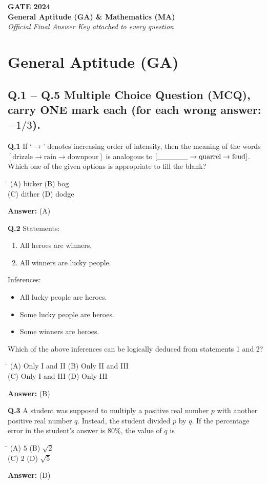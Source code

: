 \documentclass[11pt,a4paper]{article}
\newcommand{\optsfourA}[4]{%
  \begin{tabbing}
    \hspace{0.48\linewidth}\=\kill
    (A) #1 \> (B) #2 \\[2pt]
    (C) #3 \> (D) #4
  \end{tabbing}%
}
\newcommand{\ans}[1]{\textbf{Answer:} #1\par\medskip}
\begin{document}
\newpage
\begin{center}
  {\LARGE\bfseries GATE 2024}\\[4pt]
  {\large\bfseries General Aptitude (GA) \& Mathematics (MA)}\\[2pt]
  {\small\itshape Official Final Answer Key attached to every question}
\end{center}
\medskip

\section*{General Aptitude (GA)}

\subsection*{Q.1 -- Q.5 Multiple Choice Question (MCQ), carry ONE mark each (for each wrong answer: $-1/3$).}

\textbf{Q.1} If `$\to$' denotes increasing order of intensity, then the meaning of the words $[\text{drizzle} \to \text{rain} \to \text{downpour}]$ is analogous to $[\underline{\hspace{1.5cm}} \to \text{quarrel} \to \text{feud}]$. Which one of the given options is appropriate to fill the blank?
\optsfourA{bicker}{bog}{dither}{dodge}
\ans{(A)}

\textbf{Q.2} Statements:
\begin{enumerate}
  \setlength{\itemsep}{1pt}\setlength{\parskip}{0pt}
  \item All heroes are winners.
  \item All winners are lucky people.
\end{enumerate}
Inferences:
\begin{itemize}
  \setlength{\itemsep}{1pt}\setlength{\parskip}{0pt}
  \item[I.] All lucky people are heroes.
  \item[II.] Some lucky people are heroes.
  \item[III.] Some winners are heroes.
\end{itemize}
Which of the above inferences can be logically deduced from statements 1 and 2?
\optsfourA{Only I and II}{Only II and III}{Only I and III}{Only III}
\ans{(B)}

\textbf{Q.3} A student was supposed to multiply a positive real number $p$ with another positive real number $q$. Instead, the student divided $p$ by $q$. If the percentage error in the student's answer is $80\%$, the value of $q$ is
\optsfourA{$5$}{$\sqrt{2}$}{$2$}{$\sqrt{5}$}
\ans{(D)}
\end{document}
